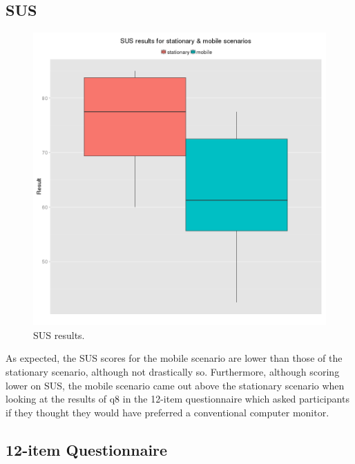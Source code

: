 \pagebreak

\subsection{SUS}

\begin{figure}[h]
	\begin{center}
		\includegraphics[width=0.7\linewidth]{images/sus.png}
		\caption{SUS results.}
		\label{sus}
	\end{center}
\end{figure}

As expected, the SUS scores for the mobile scenario are lower than those of the stationary scenario, although not drastically so. Furthermore, although scoring lower on SUS, the mobile scenario came out above the stationary scenario when looking at the results of q8 in the 12-item questionnaire which asked participants if they thought they would have preferred a conventional computer monitor.

\pagebreak

\subsection{12-item Questionnaire}

